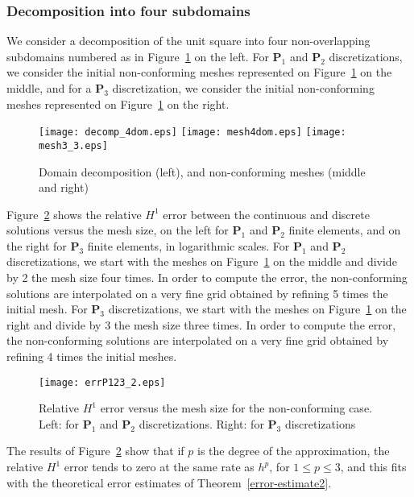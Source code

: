 \documentclass[final]{siamltex}
\begin{document}
\subsubsection{Decomposition into four subdomains}
\label{subsubsec:err4dom}
We consider a decomposition of the unit square into four non-overlapping subdomains numbered as in
Figure~\ref{fig:meshnc4dom} on the left.
For ${\mathbf{P}}_1$ and ${\mathbf{P}}_2$ discretizations, we consider the initial non-conforming meshes represented on
Figure~\ref{fig:meshnc4dom} on the middle, and for a ${\mathbf{P}}_3$ discretization, we consider the
initial non-conforming meshes represented on Figure~\ref{fig:meshnc4dom} on the right.
\begin{figure}[H]
  \centering
   \hspace{-0.85cm}
   \texttt{[image: decomp\_4dom.eps]}\hspace{-10.mm}
  \texttt{[image: mesh4dom.eps]}\hspace{-10.mm}
  \texttt{[image: mesh3\_3.eps]}
  \caption{Domain decomposition (left), and non-conforming meshes (middle and right)}
  \label{fig:meshnc4dom}
\end{figure}
Figure~\ref{fig:errorestim4dom} shows the relative $H^1$ error between the continuous and discrete solutions
versus the mesh size, on the left for ${\mathbf{P}}_1$ and ${\mathbf{P}}_2$ finite elements, and on the right for
${\mathbf{P}}_3$ finite elements, in logarithmic scales. For ${\mathbf{P}}_1$ and ${\mathbf{P}}_2$ discretizations,
we start with the meshes on Figure~\ref{fig:meshnc4dom} on the middle
and divide by 2 the mesh size four times. In order to compute the error, the
non-conforming solutions are interpolated on a very fine
grid obtained by refining 5 times the initial mesh. 
For ${\mathbf{P}}_3$ discretizations,
we start with the meshes on Figure~\ref{fig:meshnc4dom} on the right
and divide by 3 the mesh size three times. In order to compute the error,
the non-conforming solutions are interpolated on a very fine grid obtained by refining 4 times the initial meshes.

\vspace{-4mm}
\begin{figure}[H]
 \hspace{5mm}
  \texttt{[image: errP123\_2.eps]}\hspace{-1.5cm}
 \vspace*{-20pt}
  \caption{Relative $H^1$ error versus the mesh size for
     the non-conforming case. Left: for ${\mathbf{P}}_1$ and ${\mathbf{P}}_2$ discretizations. Right: for ${\mathbf{P}}_3$ discretizations}
  \label{fig:errorestim4dom}
\end{figure}
The results of Figure~\ref{fig:errorestim4dom} show
that if $p$ is the degree of the approximation, the relative $H^1$ error tends to zero at the same rate as 
$h^p$, for $1\le p \le 3$, and this fits with the theoretical error estimates of
Theorem~\ref{error-estimate2}.
\end{document}

